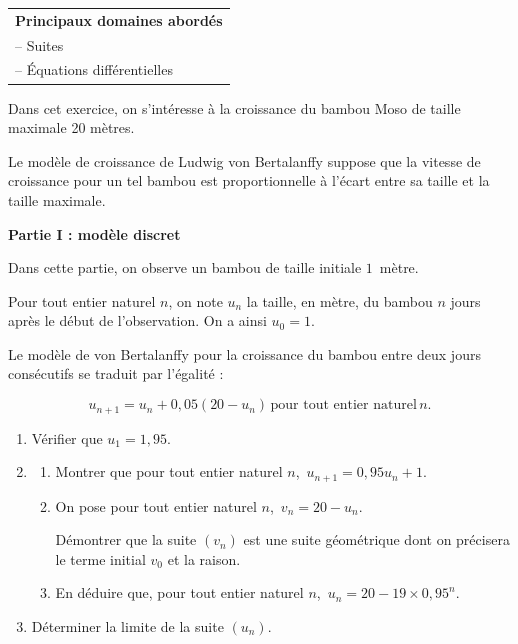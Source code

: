 \medskip

\begin{tabular}{|l|}\hline
\textbf{Principaux domaines abordés}\\
-- Suites\\
-- Équations différentielles\\ \hline
\end{tabular}

\medskip

Dans cet exercice, on s'intéresse à la croissance du bambou Moso de taille maximale 20 mètres. 

Le modèle de croissance de Ludwig von Bertalanffy suppose que la vitesse de croissance pour un tel bambou est proportionnelle à l'écart entre sa taille et la taille maximale.

\bigskip

\textbf{Partie I : modèle discret}

\medskip

Dans cette partie, on observe un bambou de taille initiale $1$~mètre.

Pour tout entier naturel $n$, on note $u_n$ la taille, en mètre, du bambou $n$ jours après le début de l'observation. On a ainsi $u_0 = 1$.

Le modèle de von Bertalanffy pour la croissance du bambou entre deux jours consécutifs se traduit par l'égalité :

\[u_{n+1} = u_n + 0,05\left(20 - u_n\right)\,  \text{pour tout entier naturel}\,  n.\]

\medskip

\begin{enumerate}
\item Vérifier que $u_1 = 1,95$.
\item 
	\begin{enumerate}
		\item Montrer que pour tout entier naturel $n$,\,  $u_{n+1} = 0,95u_n + 1$.
		\item On pose pour tout entier naturel $n$,\,  $v_n = 20 - u_n$. 
		
Démontrer que la suite $\left(v_n\right)$ est une suite géométrique dont on précisera le terme initial $v_0$ et la raison.
		\item En déduire que, pour tout entier naturel $n$,\,  $u_n = 20 - 19 \times 0,95^n$.
	\end{enumerate}
\item Déterminer la limite de la suite $\left(u_n\right)$.
\end{enumerate}

